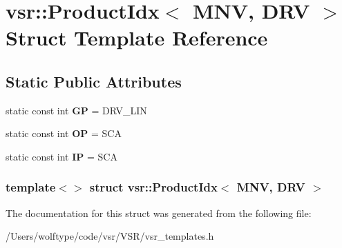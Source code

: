 \hypertarget{structvsr_1_1_product_idx_3_01_m_n_v_00_01_d_r_v_01_4}{\section{vsr\-:\-:Product\-Idx$<$ M\-N\-V, D\-R\-V $>$ Struct Template Reference}
\label{structvsr_1_1_product_idx_3_01_m_n_v_00_01_d_r_v_01_4}
}
\subsection*{Static Public Attributes}
\begin{DoxyCompactItemize}
\item 
\hypertarget{structvsr_1_1_product_idx_3_01_m_n_v_00_01_d_r_v_01_4_a6aa2b79f63a030b6c380e775a3605d81}{static const int {\bfseries G\-P} = D\-R\-V\-\_\-\-L\-I\-N}\label{structvsr_1_1_product_idx_3_01_m_n_v_00_01_d_r_v_01_4_a6aa2b79f63a030b6c380e775a3605d81}

\item 
\hypertarget{structvsr_1_1_product_idx_3_01_m_n_v_00_01_d_r_v_01_4_a56a37f322bc7f13357aa4f420c13a646}{static const int {\bfseries O\-P} = S\-C\-A}\label{structvsr_1_1_product_idx_3_01_m_n_v_00_01_d_r_v_01_4_a56a37f322bc7f13357aa4f420c13a646}

\item 
\hypertarget{structvsr_1_1_product_idx_3_01_m_n_v_00_01_d_r_v_01_4_a56918c86c1d12693ed0d783d0cc91233}{static const int {\bfseries I\-P} = S\-C\-A}\label{structvsr_1_1_product_idx_3_01_m_n_v_00_01_d_r_v_01_4_a56918c86c1d12693ed0d783d0cc91233}

\end{DoxyCompactItemize}
\subsubsection*{template$<$$>$ struct vsr\-::\-Product\-Idx$<$ M\-N\-V, D\-R\-V $>$}



The documentation for this struct was generated from the following file\-:\begin{DoxyCompactItemize}
\item 
/\-Users/wolftype/code/vsr/\-V\-S\-R/vsr\-\_\-templates.\-h\end{DoxyCompactItemize}
